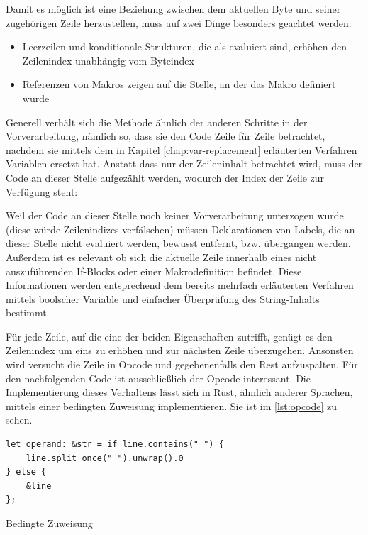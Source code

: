 Damit es möglich ist eine Beziehung zwischen dem aktuellen Byte und seiner zugehörigen Zeile herzustellen, muss auf zwei Dinge besonders geachtet werden:

\begin{itemize}
	\item Leerzeilen und konditionale Strukturen, die als  evaluiert sind, erhöhen den Zeilenindex unabhängig vom Byteindex
	\item Referenzen von Makros zeigen auf die Stelle, an der das Makro definiert wurde
\end{itemize}

Generell verhält sich die Methode ähnlich der anderen Schritte in der Vorverarbeitung, nämlich so, dass sie den Code Zeile für Zeile betrachtet, nachdem sie mittels dem in Kapitel \ref{chap:var-replacement} erläuterten Verfahren Variablen ersetzt hat. Anstatt dass nur der Zeileninhalt betrachtet wird, muss der Code an dieser Stelle aufgezählt werden, wodurch der Index der Zeile zur Verfügung steht:

\qquad{}

Weil der Code an dieser Stelle noch keiner Vorverarbeitung unterzogen wurde (diese würde Zeilenindizes verfälschen) müssen Deklarationen von Labels, die an dieser Stelle nicht evaluiert werden, bewusst entfernt, bzw. übergangen werden. Außerdem ist es relevant ob sich die aktuelle Zeile innerhalb eines nicht auszuführenden If-Blocks oder einer Makrodefinition befindet. Diese Informationen werden entsprechend dem bereits mehrfach erläuterten Verfahren mittels boolscher Variable und einfacher Überprüfung des String-Inhalts bestimmt.

Für jede Zeile, auf die eine der beiden Eigenschaften zutrifft, genügt es den Zeilenindex um eins zu erhöhen und zur nächsten Zeile überzugehen. Ansonsten wird versucht die Zeile in Opcode und gegebenenfalls den Rest aufzuspalten. Für den nachfolgenden Code ist ausschließlich der Opcode interessant. Die Implementierung dieses Verhaltens lässt sich in Rust, ähnlich anderer Sprachen, mittels einer bedingten Zuweisung implementieren. Sie ist im \cref{lst:opcode} zu sehen.

\begin{listing}[th]
\begin{verbatim}
let operand: &str = if line.contains(" ") {
    line.split_once(" ").unwrap().0
} else {
    &line
};
\end{verbatim}
\label{lst:opcode}
\caption{Bedingte Zuweisung}
\end{listing}


